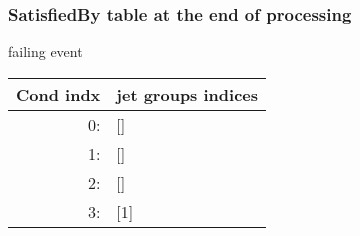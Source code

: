 \documentclass{beamer}
\begin{document}
\begin{frame}[fragile=singleslide]
\frametitle{SatisfiedBy table at the end of processing}


%
%
%
%
\begin{minipage}[t]{0.48\linewidth}
\begin{block}{failing event}
\begin{center}
\begin{tiny}
\begin{tabular}{r|l}
Cond indx& jet groups indices\\ \hline
0: & [] \\
1: & [] \\
2: & [] \\
3: & [1] \\

\end{tabular}
\end{tiny}
\end{center}
\end{block}
\end{minipage}
\end{frame}
\end{document}
